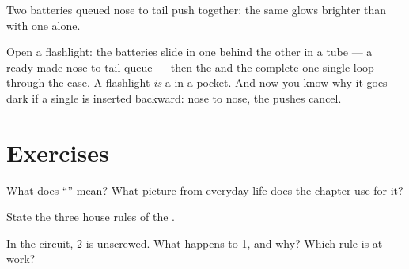\begin{omfigure}

{\small Two batteries queued nose to tail push together: the same
 glows brighter than with one  alone.}
\end{omfigure}

\begin{example}\label{ex:g4:series-circuits:flashlight}
Open a flashlight: the batteries slide in one behind the other in a
tube --- a ready-made nose-to-tail queue --- then the  and the
 complete one single loop through the case. A
flashlight \emph{is} a  in a pocket. And now you know
why it goes dark if a single  is inserted backward: nose to
nose, the pushes cancel.
\end{example}

\section{Exercises}

\begin{exercise}[$\star$]\label{exo:g4:series-circuits:1}
What does ``'' mean? What picture from everyday life does
the chapter use for it?
\end{exercise}

\begin{exercise}[$\star$]\label{exo:g4:series-circuits:2}
State the three house rules of the .
\end{exercise}

\begin{exercise}[$\star$]\label{exo:g4:series-circuits:3}
In the  circuit,  2 is unscrewed. What happens to
 1, and why? Which rule is at work?
\end{exercise}


